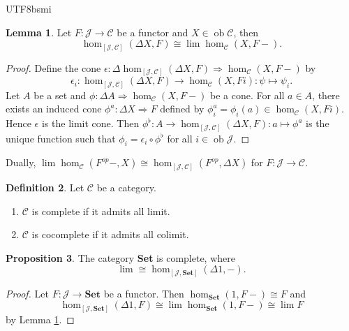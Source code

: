 \documentclass[12pt]{article}
\theoremstyle{definition}
\newtheorem{definition}{Definition}[section]
\newtheorem{property}[definition]{Proposition}
\newtheorem{lemma}[definition]{Lemma}
\newcommand\<{\langle}
\renewcommand\>{\rangle}
\DeclareMathOperator{\ob}{ob}
\begin{document}
\begin{CJK}{UTF8}{bsmi}
\begin{lemma}
\label{fundamental of limit}
    Let $F:\mathcal{J}\to\mathcal{C}$ be a functor and $X\in\ob\mathcal{C}$, then
    \[
        \hom_{[\mathcal{J}, \mathcal{C}]}(\Delta X, F) 
        \cong \lim\hom_\mathcal{C}(X, F-).
    \]
\end{lemma}
\begin{proof}
    Define the cone $\epsilon:\Delta\hom_{[\mathcal{J}, \mathcal{C}]}(\Delta X, F)\Rightarrow\hom_\mathcal{C}(X, F-)$ by
    \[
        \epsilon_i:\hom_{[\mathcal{J}, \mathcal{C}]}(\Delta X, F)\to\hom_\mathcal{C}(X, Fi):\psi\mapsto\psi_i.
    \]
    Let $A$ be a set and $\phi:\Delta A\Rightarrow\hom_\mathcal{C}(X, F-)$ be a cone.
    For all $a\in A$, there exists an induced cone $\phi ^a:\Delta X\Rightarrow F$ defined by $\phi^a_i=\phi_i(a)\in\hom_\mathcal{C}(X, Fi)$.
    Hence $\epsilon$ is the limit cone.
    Then $\phi^\flat:A\to\hom_{[\mathcal{J}, \mathcal{C}]}(\Delta X, F):a\mapsto\phi^a$ is the unique function such that $\phi_i=\epsilon_i\circ\phi^\flat$ for all $i\in\ob\mathcal{J}$.
\end{proof}

Dually, $\lim\hom_\mathcal{C}(F^{op}-, X)\cong\hom_{[\mathcal{J}, \mathcal{C}]}(F^{op}, \Delta X)$ for $F:\mathcal{J}\to\mathcal{C}$.

\begin{definition}
    Let $\mathcal{C}$ be a category.
    \begin{enumerate}
        \item $\mathcal{C}$ is complete if it admits all limit.
        \item $\mathcal{C}$ is cocomplete if it admits all colimit.
    \end{enumerate}
\end{definition}

\begin{property}
    The category \textbf{Set} is complete, where
    \[
        \lim \cong \hom_{[\mathcal{J}, \textbf{Set}]}(\Delta1, -).
    \]
\end{property}
\begin{proof}
    Let $F:\mathcal{J}\to\textbf{Set}$ be a functor.
    Then $\hom_\textbf{Set}(1, F-)\cong F$ and
    \[
        \hom_{[\mathcal{J}, \textbf{Set}]}(\Delta1, F) 
        \cong \lim\hom_\textbf{Set}(1, F-) 
        \cong \lim F
    \]
    by Lemma \ref{fundamental of limit}.
\end{proof}


\end{CJK}
\end{document}
